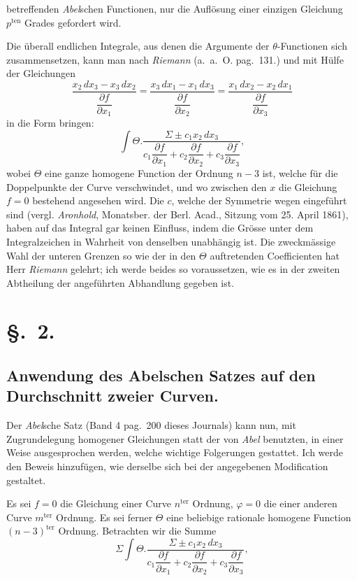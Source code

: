 \documentclass{article}
\begin{document}
betreffenden \emph{Abel}schen Functionen, nur die Auflösung einer einzigen Gleichung $p^{\text{ten}}$ Grades gefordert wird.

Die überall endlichen Integrale, aus denen die Argumente der $\theta$-Functionen sich zusammensetzen, kann man nach \emph{Riemann} (a.\ a.\ O. pag.\ 131.) und mit Hülfe der Gleichungen
\[ \frac{x_{2}\,dx_{3} - x_{3}\,dx_{2}}{\dfrac{\partial f}{\partial x_{1}}} = \frac{x_{3}\,dx_{1} - x_{1}\,dx_{3}}{\dfrac{\partial f}{\partial x_{2}}} = \frac{x_{1}\,dx_{2} - x_{2}\,dx_{1}}{\dfrac{\partial f}{\partial x_{3}}} \]
in die Form bringen:
\[ \int \Theta.\frac{\Sigma\pm c_{1}x_{2}\,dx_{3}}{c_{1}\dfrac{\partial f}{\partial x_{1}} + c_{2}\dfrac{\partial f}{\partial x_{2}} + c_{3}\dfrac{\partial f}{\partial x_{3}}}, \]
wobei $\Theta$ eine ganze homogene Function der Ordnung $n-3$ ist, welche für die Doppelpunkte der Curve verschwindet, und wo zwischen den $x$ die Gleichung $f = 0$ bestehend angesehen wird. Die $c$, welche der Symmetrie wegen eingeführt sind (vergl. \emph{Aronhold}, Monatsber. der Berl. Acad., Sitzung vom 25. April 1861), haben auf das Integral gar keinen Einfluss, indem die Grösse unter dem Integralzeichen in Wahrheit von denselben unabhängig ist. Die zweckmässige Wahl der unteren Grenzen so wie der in den $\Theta$ auftretenden Coefficienten hat Herr \emph{Riemann} gelehrt; ich werde beides so voraussetzen, wie es in der zweiten Abtheilung der angeführten Abhandlung gegeben ist.

\section*{§.~2.}
\subsection*{Anwendung des Abelschen Satzes auf den Durchschnitt zweier Curven.}

Der \emph{Abel}sche Satz (Band 4 pag.\ 200 dieses Journals) kann nun, mit Zugrundelegung homogener Gleichungen statt der von \emph{Abel} benutzten, in einer Weise ausgesprochen werden, welche wichtige Folgerungen gestattet. Ich werde den Beweis hinzufügen, wie derselbe sich bei der angegebenen Modification gestaltet.

Es sei $f = 0$ die Gleichung einer Curve $n^{\text{ter}}$ Ordnung, $\varphi = 0$ die einer anderen Curve $m^{\text{ter}}$ Ordnung. Es sei ferner $\Theta$ eine beliebige rationale homogene Function $(n-3)^{\text{ter}}$ Ordnung. Betrachten wir die Summe
\[ \Sigma\int \Theta.\frac{\Sigma\pm c_{1}x_{2}\,dx_{3}}{c_{1}\dfrac{\partial f}{\partial x_{1}} + c_{2}\dfrac{\partial f}{\partial x_{2}} + c_{3}\dfrac{\partial f}{\partial x_{3}}}, \]
\end{document}
